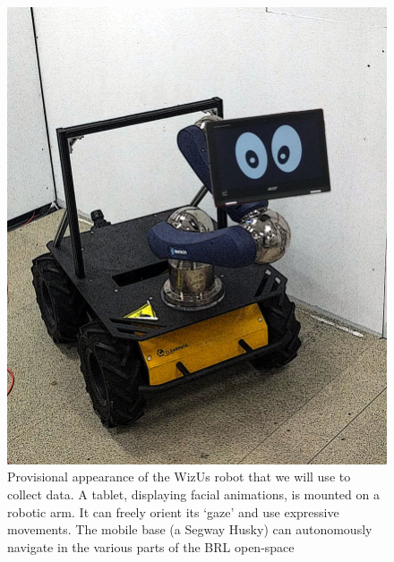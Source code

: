 \documentclass[11pt,a4paper]{report}
\newcommand{\project}{WizUs\xspace}
\begin{document}
\begin{figure}
    \centering
    \includegraphics[width=\linewidth]{figs/husky.jpg}
    \caption{\label{fig:robot}
    Provisional appearance of the \project robot that we will use to collect
    data. A tablet, displaying facial animations, is mounted on a robotic arm.
    It can freely orient its `gaze' and use expressive movements. The mobile
    base (a Segway Husky) can autonomously navigate in the various parts of the
    BRL open-space}
\end{figure}
\end{document}
